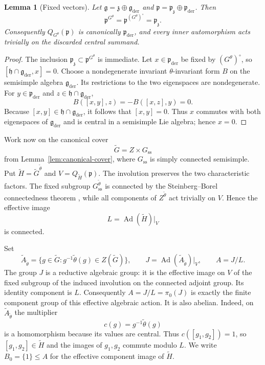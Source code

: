\documentclass[11pt,reqno]{amsart}
\numberwithin{equation}{section}
\newtheorem{lemma}[theorem]{Lemma}
\theoremstyle{definition}
\theoremstyle{remark}
\newcommand{\Ad}{\operatorname{Ad}}
\newcommand{\fg}{\mathfrak g}
\newcommand{\fz}{\mathfrak z}
\newcommand{\fh}{\mathfrak h}
\newcommand{\fp}{\mathfrak p}
\begin{document}
\begin{lemma}[Fixed vectors]\label{lem:fixed-vectors}
Let $\fg=\fz\oplus\fg_{\mathrm{der}}$ and
$\fp=\fp_{\fz}\oplus\fp_{\mathrm{der}}$.  Then
\[
  \fp^{G^\theta}=\fp^{(G^\theta)^\circ}=\fp_{\fz}.
\]
Consequently $Q_{G^\theta}(\fp)$ is canonically $\fp_{\mathrm{der}}$, and every
inner automorphism acts trivially on the discarded central summand.
\end{lemma}

\begin{proof}
The inclusion $\fp_{\fz}\subset\fp^{G^\theta}$ is immediate.  Let
$x\in\fp_{\mathrm{der}}$ be fixed by $(G^\theta)^\circ$, so
$[\fh\cap\fg_{\mathrm{der}},x]=0$.  Choose a nondegenerate invariant
$\theta$-invariant form $B$ on the semisimple algebra $\fg_{\mathrm{der}}$.
Its restrictions to the two eigenspaces are nondegenerate.  For
$y\in\fp_{\mathrm{der}}$ and $z\in\fh\cap\fg_{\mathrm{der}}$,
\[
  B([x,y],z)=-B([x,z],y)=0.
\]
Because $[x,y]\in\fh\cap\fg_{\mathrm{der}}$, it follows that $[x,y]=0$.
Thus $x$ commutes with both eigenspaces of $\fg_{\mathrm{der}}$ and is central
in a semisimple Lie algebra; hence $x=0$.
\end{proof}

Work now on the canonical cover
\[
 \widetilde G=Z\times G_{\mathrm{ss}}
\]
from Lemma~\ref{lem:canonical-cover}, where $G_{\mathrm{ss}}$ is simply
connected semisimple.  Put $\widetilde H=\widetilde G^{\widetilde\theta}$ and
$V=Q_{\widetilde H}(\fp)$.  The involution preserves the two characteristic
factors.  The fixed subgroup $G_{\mathrm{ss}}^{\widetilde\theta}$ is connected
by the Steinberg--Borel connectedness theorem \cite{Borel,Steinberg}, while all
components of $Z^{\widetilde\theta}$ act trivially on $V$.  Hence the effective
image
\[
 L=\Ad(\widetilde H)|_V
\]
is connected.

Set
\[
 \widetilde A_{\widetilde\theta}
 =\{g\in\widetilde G:g^{-1}\widetilde\theta(g)\in Z(\widetilde G)\},
 \qquad
 J=\Ad(\widetilde A_{\widetilde\theta})|_V,
 \qquad A=J/L.
\]
The group $J$ is a reductive algebraic group: it is the effective image on
$V$ of the fixed subgroup of the induced involution on the connected adjoint
group.  Its identity component is $L$.  Consequently
$A=J/L=\pi_0(J)$ is exactly the finite component group of this effective
algebraic action.
It is also abelian.  Indeed, on $\widetilde A_{\widetilde\theta}$ the multiplier
\[
 c(g)=g^{-1}\widetilde\theta(g)
\]
is a homomorphism because its values are central.  Thus
$c([g_1,g_2])=1$, so $[g_1,g_2]\in\widetilde H$ and the images of $g_1,g_2$
commute modulo $L$.  We write $B_0=\{1\}\leq A$ for the effective component
image of $\widetilde H$.
\end{document}
